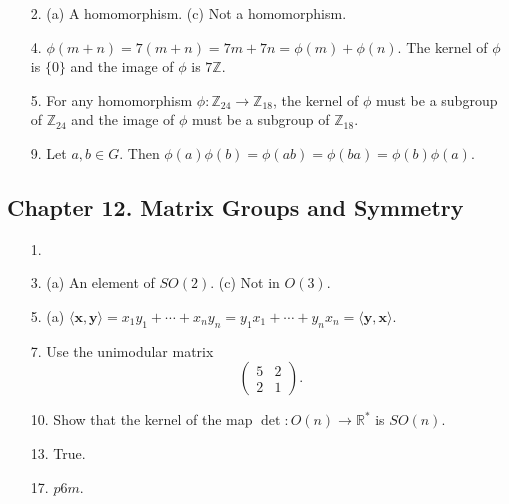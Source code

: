 {\small
\begin{itemize}
 

 
 
\item[2.]
(a) A homomorphism.
(c) Not a homomorphism.
 
 
\item[4.]
$\phi(m + n) = 7(m+n) = 7m + 7n = \phi(m) + \phi(n)$. The kernel of
$\phi$ is $\{ 0 \}$ and the image of $\phi$ is $7{\mathbb Z}$.
 
 
\item[5.]
For any homomorphism $\phi : {\mathbb Z}_{24} \rightarrow {\mathbb
Z}_{18}$, the kernel of $\phi$ must be a subgroup of ${\mathbb Z}_{24}$
and the image of $\phi$ must be a subgroup of ${\mathbb Z}_{18}$.
 
 
\item[9.]
Let $a, b \in G$. Then $\phi(a) \phi(b) = \phi(ab) = \phi(ba) =
\phi(b)\phi(a)$. 
 
 
 
 
\end{itemize}
}

 
\subsection*{Chapter 12. Matrix Groups and Symmetry}
 
{\small
\begin{itemize}
 
\item[1.]
 
\item[3.]
(a) An element of $SO(2)$.
(c) Not in $O(3)$.
 
\item[5.]
(a) 
$\langle {\mathbf x}, {\mathbf y} \rangle = x_1 y_1 + \cdots + x_n y_n =
y_1 x_1 + \cdots + y_n x_n = \langle {\mathbf y}, {\mathbf x} \rangle$.
 
\item[7.]
Use the unimodular matrix 
\[
\begin{pmatrix}
5 & 2 \\
2 & 1
\end{pmatrix}.
\]
 
\item[10.]
Show that the kernel of the map $\det : O(n) \rightarrow {\mathbb R}^*$
is $SO(n)$.
 
\item[13.]
True.
 
\item[17.]
$p6m$.
 
 
 
\end{itemize}
}
 
